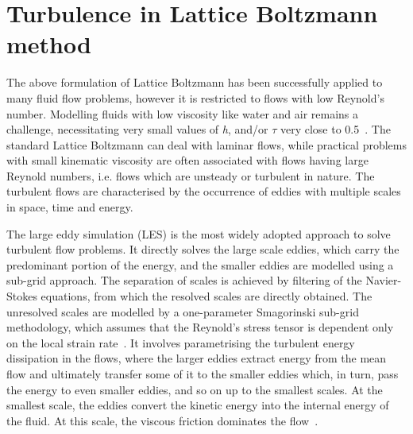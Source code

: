 
\section{Turbulence in Lattice Boltzmann method}

The above formulation of Lattice Boltzmann has been successfully 
applied to many fluid flow problems, however it is restricted to flows with low 
Reynold's number. Modelling fluids with low viscosity like water and air 
remains a challenge, necessitating very small values of \textit{h}, and/or 
$\tau$ very close to 0.5~\citep{He1997}. The standard Lattice Boltzmann can 
deal with laminar flows, while practical problems with small kinematic 
viscosity are often associated with flows having large Reynold numbers, i.e. 
flows which are unsteady or turbulent in nature. The turbulent flows are 
characterised by 
the occurrence of eddies with multiple scales in space, time and energy.

The large eddy simulation (LES) is the most widely adopted approach to 
solve turbulent flow problems. It directly solves the large scale eddies, which 
carry the predominant portion of the energy, and the smaller eddies are 
modelled using a sub-grid approach. The separation of scales is achieved by 
filtering of the Navier-Stokes equations, from which the resolved scales are 
directly obtained. The unresolved scales are modelled by a one-parameter 
Smagorinski sub-grid methodology, which assumes that the Reynold's stress 
tensor is dependent only on the local strain rate~\citep{Smagorinsky1963}. It 
involves parametrising the turbulent energy dissipation in the flows, where the 
larger eddies extract energy from the mean flow and ultimately transfer some of 
it to the smaller eddies which, in turn, pass the energy to even smaller 
eddies, and so on up to the smallest scales. At the smallest scale, the eddies 
convert the kinetic energy into the internal energy of the fluid. At this 
scale, the viscous friction dominates the flow~\citep{Frisch1995}.

